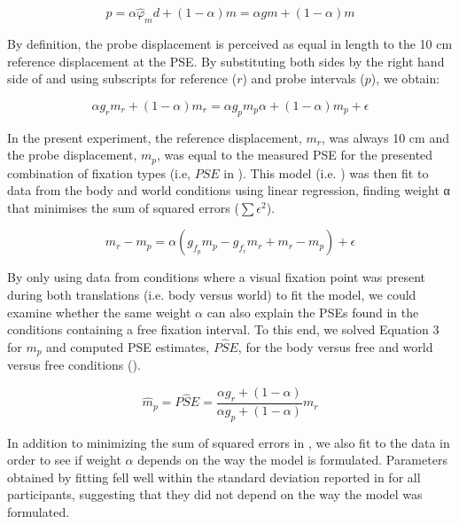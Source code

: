 \begin{equation}
\label{p3:eq2}
p = \alpha \hat{\varphi}_m d + (1 - \alpha) m = \alpha g m + (1 - \alpha) m
\end{equation}

By definition, the probe displacement is perceived as equal in length to the 10 \si{\centi\metre} reference displacement at the PSE. By substituting both sides by the right hand side of  and using subscripts for reference ($r$) and probe intervals ($p$), we obtain:

\begin{equation}
\label{p3:eq3}
\alpha g_r m_r + (1 - \alpha) m_r = \alpha  g_p m_p \alpha + (1 - \alpha) m_p + \epsilon
\end{equation}

In the present experiment, the reference displacement, $m_r$, was always 10 \si{\centi\metre} and the probe displacement, $m_p$, was equal to the measured PSE for the presented combination of fixation types (i.e, $PSE$ in ). This model (i.e. ) was then fit to data from the body and world conditions using linear regression, finding weight α that minimises the sum of squared errors ($\sum{\epsilon^2}$).

\begin{equation}
\label{p3:eq4}
m_r - m_p = \alpha(g_{f_p} m_p - g_{f_r} m_r + m_r - m_p) + \epsilon
\end{equation}

By only using data from conditions where a visual fixation point was present during both translations (i.e. body versus world) to fit the model, we could examine whether the same weight $\alpha$ can also explain the PSEs found in the conditions containing a free fixation interval. To this end, we solved Equation 3 for $m_p$ and computed PSE estimates, $P\hat{S}E$, for the body versus free and world versus free conditions ().

\begin{equation}
\label{p3:eq5}
\hat{m}_p = P\hat{S}E = \frac
	{\alpha g_r + (1 - \alpha)}
	{\alpha g_p + (1 - \alpha)}
    m_r
\end{equation}

In addition to minimizing the sum of squared errors in , we also fit  to the data in order to see if weight $\alpha$ depends on the way the model is formulated. Parameters obtained by fitting  fell well within the standard deviation reported in  for all participants, suggesting that they did not depend on the way the model was formulated.


